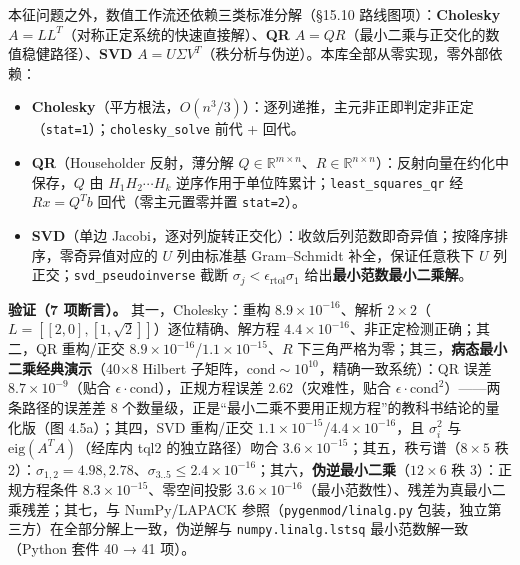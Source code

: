 \documentclass[
]{ctexbook}
\providecommand{\tightlist}{%
  \setlength{\itemsep}{0pt}\setlength{\parskip}{0pt}}
\begin{document}
本征问题之外，数值工作流还依赖三类标准分解（§15.10
路线图项）：\textbf{Cholesky}
\(A=LL^{T}\)（对称正定系统的快速直接解）、\textbf{QR}
\(A=QR\)（最小二乘与正交化的数值稳健路径）、\textbf{SVD}
\(A=U\Sigma V^{T}\)（秩分析与伪逆）。本库全部从零实现，零外部依赖：

\begin{itemize}
\tightlist
\item
  \textbf{Cholesky}（平方根法，\(O(n^{3}/3)\)）：逐列递推，主元非正即判定非正定（\texttt{stat=1}）；\texttt{cholesky\_solve}
  前代 + 回代。
\item
  \textbf{QR}（Householder 反射，薄分解
  \(Q\in\mathbb{R}^{m\times n}\)、\(R\in\mathbb{R}^{n\times n}\)）：反射向量在约化中保存，\(Q\)
  由 \(H_1H_2\cdots H_k\)
  逆序作用于单位阵累计；\texttt{least\_squares\_qr} 经 \(Rx=Q^{T}b\)
  回代（零主元置零并置 \texttt{stat=2}）。
\item
  \textbf{SVD}（单边
  Jacobi，逐对列旋转正交化）：收敛后列范数即奇异值；按降序排序，零奇异值对应的
  \(U\) 列由标准基 Gram--Schmidt 补全，保证任意秩下 \(U\)
  列正交；\texttt{svd\_pseudoinverse} 截断
  \(\sigma_j<\epsilon_{\text{rtol}}\sigma_1\)
  给出\textbf{最小范数最小二乘解}。
\end{itemize}

\textbf{验证（7 项断言）。} 其一，Cholesky：重构
\(8.9\times10^{-16}\)、解析
\(2\times2\)（\(L=[[2,0],[1,\sqrt2]]\)）逐位精确、解方程
\(4.4\times10^{-16}\)、非正定检测正确；其二，QR 重构/正交
\(8.9\times10^{-16}\)/\(1.1\times10^{-15}\)、\(R\)
下三角严格为零；其三，\textbf{病态最小二乘经典演示}（40×8 Hilbert
子矩阵，\(\mathrm{cond}\sim10^{10}\)，精确一致系统）：QR 误差
\(8.7\times10^{-9}\)（贴合
\(\epsilon\cdot\mathrm{cond}\)），正规方程误差 \(2.62\)（灾难性，贴合
\(\epsilon\cdot\mathrm{cond}^{2}\)）------两条路径的误差差 8
个数量级，正是``最小二乘不要用正规方程''的教科书结论的量化版（图
4.5a）；其四，SVD 重构/正交
\(1.1\times10^{-15}\)/\(4.4\times10^{-16}\)，且 \(\sigma_i^{2}\) 与
\(\mathrm{eig}(A^{T}A)\)（经库内 tql2 的独立路径）吻合
\(3.6\times10^{-15}\)；其五，秩亏谱（\(8\times5\) 秩
2）：\(\sigma_{1,2}=4.98,2.78\)、\(\sigma_{3..5}\le2.4\times10^{-16}\)；其六，\textbf{伪逆最小二乘}（\(12\times6\)
秩 3）：正规方程条件 \(8.3\times10^{-15}\)、零空间投影
\(3.6\times10^{-16}\)（最小范数性）、残差为真最小二乘残差；其七，与
NumPy/LAPACK 参照（\texttt{pygenmod/linalg.py}
包装，独立第三方）在全部分解上一致，伪逆解与 \texttt{numpy.linalg.lstsq}
最小范数解一致（Python 套件 40 → 41 项）。
\end{document}

